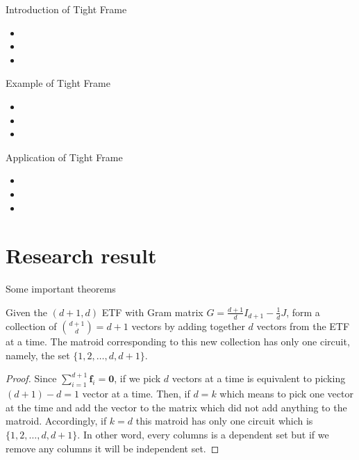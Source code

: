 \documentclass{beamer}
\renewcommand{\vec}[1]{\mathbf{#1}}
\begin{document}
\begin{frame}{Introduction of Tight Frame}
  \begin{itemize}
    \item 
    \item 
    \item 
  \end{itemize}
\end{frame}

\begin{frame}{Example of Tight Frame}
  \begin{itemize}
    \item 
    \item 
    \item 
  \end{itemize}
\end{frame}

\begin{frame}{Application of Tight Frame}
  \begin{itemize}
    \item 
    \item 
    \item 
  \end{itemize}
\end{frame}


\section{Research result}
\begin{frame}{Some important theorems}
    \begin{theorem}[K. Lin, 2023]
Given the $(d+1, d)$ ETF with Gram matrix
$G = \frac{d+1}{d}I_{d+1} -\frac{1}{d}J$,
form a collection of $\binom{d+1}{d} = d+1$ vectors by adding together $d$ vectors from the ETF at a time.
The matroid corresponding to this new collection has only one circuit, namely, the set $\{1, 2, \ldots, d, d+1\}$.
\end{theorem}
\begin{proof}
Since $\sum_{i=1}^{d+1}\vec{f}_i = \vec{0}$,
if we pick $d$ vectors at a time is equivalent to picking $(d+1)-d = 1$ vector at a time. 
Then, if $d=k$ which means to pick one vector at the time and add the vector to the matrix which did not add anything to the matroid.
Accordingly, if $k=d$ this matroid has only one circuit which is $\{1, 2, \ldots, d, d+1\}$.
In other word, every columns is a dependent set but if we remove any columns it will be independent set.
\end{proof}
\end{frame}
\end{document}
